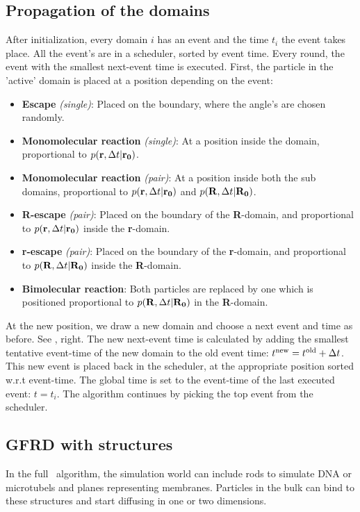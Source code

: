 \subsection{Propagation of the domains}
After initialization, every domain $i$ has an event and the time $t_i$ the event takes place. All the event's are in a scheduler, sorted by event time. Every round, the event with the smallest next-event time is executed. First, the particle in the 'active' domain is placed at a position depending on the event: 
\begin{itemize}
 \item {\bf Escape} {\it (single)}: Placed on the boundary, where the angle's are chosen randomly.
 \item {\bf Monomolecular reaction} {\it (single)}: At a position inside the domain, proportional to $p({\bf r},\Delta t|{\bf r_0})$.
 \item {\bf Monomolecular reaction} {\it (pair)}: At a position inside both the sub domains, proportional to $p({\bf r},\Delta t|{\bf r_0})$ and $p({\bf R},\Delta t|{\bf R_0})$.
 \item {\bf R-escape} {\it (pair)}: Placed on the boundary of the {\bf R}-domain, and proportional to $p({\bf r},\Delta t|{\bf r_0})$ inside the {\bf r}-domain.
 \item {\bf r-escape} {\it (pair)}: Placed on the boundary of the {\bf r}-domain, and proportional to $p({\bf R},\Delta t|{\bf R_0})$ inside the {\bf R}-domain. 
 \item {\bf Bimolecular reaction}: Both particles are replaced by one which is positioned proportional to $p({\bf R},\Delta t|{\bf R_0})$ in the {\bf R}-domain.
\end{itemize}
At the new position, we draw a new domain and choose a next event and time as before. See , right. The new next-event time is calculated by adding the smallest tentative event-time of the new domain to the old event time: $t^{\rm new} =  t^{\rm old} + \Delta t$. This new event is placed back in the scheduler, at the appropriate position sorted w.r.t event-time. The global time is set to the event-time of the last executed event: $t=t_i$. The algorithm continues by picking the top event from the scheduler.

\subsection{GFRD with structures}
In the full \GFRD\ algorithm, the simulation world can include rods to simulate DNA or microtubels and planes representing membranes. Particles in the bulk can bind to these structures and start diffusing in one or two dimensions.